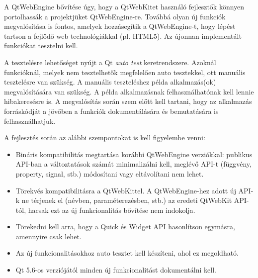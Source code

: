 \documentclass[12pt]{report}
\begin{document}
\noindent
A QtWebEngine bővítése úgy, hogy a QtWebKitet használó fejlesztők könnyen portolhassák
a projektjüket QtWebEngine-re.
Továbbá olyan új funkciók megvalósítása is fontos, amelyek hozzásegítik a
QtWebEngine-t, hogy lépést tartson a fejlődő web technológiákkal (pl. HTML5).
Az újonnan implementált funkciókat tesztelni kell.

\bigskip
\noindent
A tesztelésre lehetőséget nyújt a Qt \textit{auto test} keretrendszere. Azoknál funkcióknál,
melyek nem tesztelhetők megfelelően auto tesztekkel, ott manuális tesztelésre van szükség.
A manuális teszteléshez példa alkalmazás(ok) megvalósítására van szükség. A példa
alkalmazásnak felhasználhatónak kell lennie hibakeresésre is. A megvalósítás során szem
előtt kell tartani, hogy az alkalmazás forráskódját a jövőben a funkciók dokumentálására és
bemutatására is felhasználhatjuk.

\bigskip
\noindent
A fejlesztés során az alábbi szempontokat is kell figyelembe venni:
\begin{itemize}
    \item Bináris kompatibilitás megtartása korábbi QtWebEngine verziókkal:
        publikus API-ban a változtatások számát minimalizálni kell,
        meglévő API-t (függvény, property, signal, stb.) módosítani vagy eltávolítani
        nem lehet.
    \item Törekvés kompatibilitásra a QtWebKittel.
        A QtWebEngine-hez adott új API-k ne térjenek el (névben, paraméterezésben, stb.)
        az eredeti QtWebKit API-tól, hacsak ezt az új funkcionalitás bővítése nem indokolja.
    \item Törekedni kell arra, hogy a Quick és Widget API hasonlítson egymásra,
        amennyire csak lehet.
    \item Az új funkcionalitásokhoz auto tesztet kell készíteni,
        ahol ez megoldható.
    \item Qt 5.6-os verziójától minden új funkcionalitást dokumentálni kell.
\end{itemize}
\end{document}

